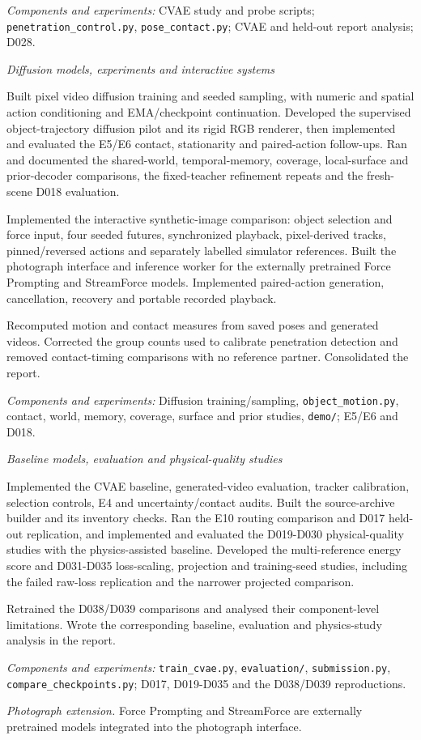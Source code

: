 \documentclass[11pt,a4paper]{article}
\newcommand{\member}[2]{%
  \par\addvspace{13pt}{\bfseries\fontsize{13.2}{16}\selectfont #1}\par\nobreak
  {\itshape #2}\par\nobreak\vspace{2pt}}
\newcommand{\evidence}[1]{\par{\fontsize{9.5}{12}\selectfont\textit{Components and experiments:} #1\par}}
\begin{document}
\evidence{CVAE study and probe scripts; \texttt{penetration\_control.py},
\texttt{pose\_contact.py}; CVAE and held-out report analysis; D028.}

\newpage
\member{MAITI SHRIJEET}{Diffusion models, experiments and interactive systems}
Built pixel video diffusion training and seeded sampling, with numeric and spatial
action conditioning and EMA/checkpoint continuation. Developed the supervised
object-trajectory diffusion pilot and its
rigid RGB renderer, then implemented and evaluated the E5/E6 contact,
stationarity and paired-action follow-ups. Ran and documented the shared-world,
temporal-memory, coverage, local-surface and prior-decoder comparisons, the
fixed-teacher refinement repeats and the fresh-scene D018 evaluation.

Implemented the interactive synthetic-image comparison: object selection and
force input, four seeded futures, synchronized playback, pixel-derived tracks,
pinned/reversed actions and separately labelled simulator references. Built
the photograph interface and inference worker for the externally pretrained
Force Prompting and StreamForce models. Implemented paired-action generation,
cancellation, recovery and portable recorded playback.

Recomputed motion and contact measures from saved poses and generated videos.
Corrected the group counts used to calibrate penetration detection and removed
contact-timing comparisons with no reference partner. Consolidated the report.

\evidence{Diffusion training/sampling, \texttt{object\_motion.py}, contact,
world, memory, coverage, surface and prior studies, \texttt{demo/}; E5/E6 and D018.}

\member{BOBAN ATHUL KRISHNA}{Baseline models, evaluation and physical-quality studies}
Implemented the CVAE baseline, generated-video evaluation, tracker calibration,
selection controls, E4 and uncertainty/contact audits. Built the source-archive
builder and its inventory checks.
Ran the E10 routing comparison and D017 held-out replication, and implemented
and evaluated the D019-D030 physical-quality studies with the physics-assisted
baseline. Developed the multi-reference energy score and D031-D035
loss-scaling, projection and training-seed studies, including the failed raw-loss
replication and the narrower projected comparison.

Retrained the D038/D039 comparisons and analysed their component-level
limitations. Wrote the corresponding baseline, evaluation and physics-study
analysis in the report.

\evidence{\texttt{train\_cvae.py}, \texttt{evaluation/},
\texttt{submission.py}, \texttt{compare\_checkpoints.py};
D017, D019-D035 and the D038/D039 reproductions.}

\medskip
{\small\textit{Photograph extension.} Force Prompting and StreamForce
are externally pretrained models integrated into the photograph interface.}
\end{document}

